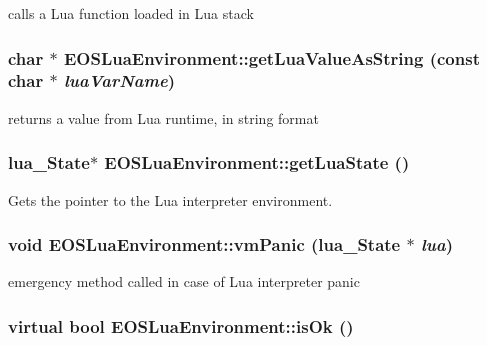 calls a Lua function loaded in Lua stack 

\hypertarget{classEOSLuaEnvironment_f0ec64cece3cb022704af6aab5377bbf}{
\subsubsection[{getLuaValueAsString}]{\setlength{\rightskip}{0pt plus 5cm}char $\ast$ EOSLuaEnvironment::getLuaValueAsString (const char $\ast$ {\em luaVarName})}}
\label{classEOSLuaEnvironment_f0ec64cece3cb022704af6aab5377bbf}


returns a value from Lua runtime, in string format 

\hypertarget{classEOSLuaEnvironment_f0e9201ab81ce4be089f0f99197a06b1}{
\subsubsection[{getLuaState}]{\setlength{\rightskip}{0pt plus 5cm}lua\_\-State$\ast$ EOSLuaEnvironment::getLuaState ()}}
\label{classEOSLuaEnvironment_f0e9201ab81ce4be089f0f99197a06b1}


Gets the pointer to the Lua interpreter environment. 

\hypertarget{classEOSLuaEnvironment_cfd50ba33863147fab881765110410c0}{
\subsubsection[{vmPanic}]{\setlength{\rightskip}{0pt plus 5cm}void EOSLuaEnvironment::vmPanic (lua\_\-State $\ast$ {\em lua})}}
\label{classEOSLuaEnvironment_cfd50ba33863147fab881765110410c0}


emergency method called in case of Lua interpreter panic 

\hypertarget{classEOSLuaEnvironment_b56241a405c111658211cab0706fff71}{
\subsubsection[{isOk}]{\setlength{\rightskip}{0pt plus 5cm}virtual bool EOSLuaEnvironment::isOk ()}}
\label{classEOSLuaEnvironment_b56241a405c111658211cab0706fff71}


